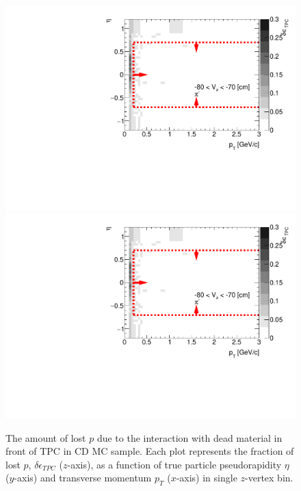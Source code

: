 \begin{figure}[H]
	\caption[The amount of lost $p$ due to the interaction with dead material in front of TPC as a function of $p_T$, $\eta$ and $z$-vertex in CD]{The amount of lost $p$ due to the interaction with dead material in front of TPC in CD MC sample. Each plot represents the fraction of lost $p$, $\delta\epsilon_{ TPC}$ ($z$-axis), as a function of true particle pseudorapidity $\eta$ ($y$-axis) and transverse momentum $p_{T}$ ($x$-axis) in single $z$-vertex bin.}\label{fig:dead_materialCD3Dp}
	\parbox{0.325\textwidth}{
		\includegraphics[width=\linewidth,page=81]{graphics/systematicsEfficiency/deadMaterial/secondaries_Unbinned_CD_.pdf}\\
		\includegraphics[width=\linewidth,page=84]{graphics/systematicsEfficiency/deadMaterial/secondaries_Unbinned_CD_.pdf}\\
}
\end{figure}
